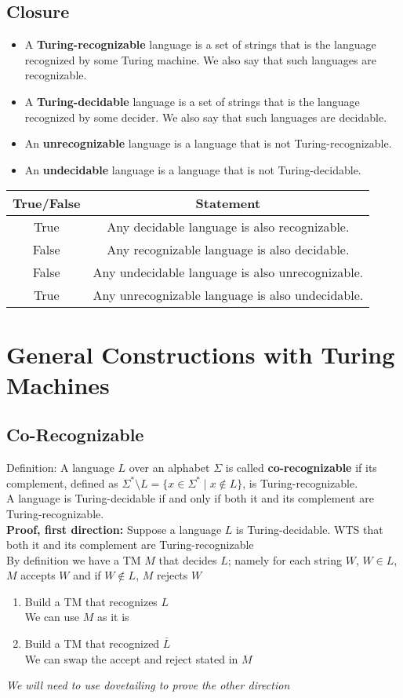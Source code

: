 \documentclass{article}
\begin{document}
\subsection{Closure}
\begin{itemize}
    \item A {\bf Turing-recognizable} language is a set of strings that 
is the language recognized by some Turing machine. We also 
say that such languages are recognizable.
    \item A {\bf Turing-decidable} language is a set of strings that 
is the language recognized by some decider. We also 
say that such languages are decidable.
    \item An {\bf unrecognizable} language is a language that is not Turing-recognizable.
    \item An {\bf undecidable} language is a language that is not Turing-decidable.
\end{itemize}
\begin{tabular}{c|c}
    True/False & Statement \\
    \hline
    True & Any  decidable language  is  also  recognizable.\\
    False & Any  recognizable language  is  also  decidable.\\
    False & Any  undecidable language  is  also  unrecognizable.\\
    True & Any  unrecognizable language  is  also  undecidable.
\end{tabular}
\section{General Constructions with Turing Machines}
\label{sec:general}
\subsection{Co-Recognizable}
Definition: A language $L$ over an  alphabet $\Sigma$ is called {\bf co-recognizable} if its complement,  defined
as $\Sigma^* \setminus L  = \{ x  \in  \Sigma^* \mid x \notin  L \}$, is Turing-recognizable.\\
\newline
A  language is Turing-decidable if and only if both  it and its complement are Turing-recognizable.\\
\newline
\textbf{Proof, first direction:} Suppose a language $L$ is Turing-decidable. WTS that both it and its complement are Turing-recognizable\\
By definition we have a TM $M$ that decides $L$; namely for each string $W$, $W\in L$, $M$ accepts $W$ and if $W\notin L$, $M$ rejects $W$
\begin{enumerate}
    \item Build a TM that recognizes $L$\\
    We can use $M$ as it is
    \item Build a TM that recognized $\bar L$\\
    We can swap the accept and reject stated in $M$
\end{enumerate}
\textit{We will need to use dovetailing to prove the other direction}
\end{document}
